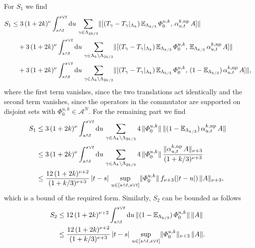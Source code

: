 \documentclass[a4paper]{article}
\newcommand{\E}{\mathbb{E}}
\renewcommand{\Phi}{\varPhi}
\newcommand{\mA}{\mathcal{A}}
\newcommand{\dd}{\mathrm{d}}
\DeclarePairedDelimiter\norm{\lVert}{\rVert}
\DeclarePairedDelimiter\abs{\lvert}{\rvert}
\theoremstyle{plain}
\theoremstyle{definition}
\theoremstyle{remark}
\renewcommand{\(}{\left(}
\renewcommand{\)}{\right)}
\begin{document}
    For $S_1$ we find
    \begin{align*}
        S_1
        &\leq 
        3\,(1+2k)^\nu \int_{s\land t}^{s\lor t} \dd u \, \sum_{\gamma \in \Lambda_{2k/3}} \norm{[(T_\gamma - T_\gamma|_{\Lambda_k})\, \E_{\Lambda_{k/3}} \, \Phi_0^{u,k}, \, \alpha_{u,t}^{k,\mathrm{np}} \, A] }
        \\
        &\hspace{1em}+
        3\,(1+2k)^\nu \int_{s\land t}^{s\lor t} \dd u \, \sum_{\gamma \in \Lambda_k \setminus \Lambda_{2k/3}} \norm{[(T_\gamma - T_\gamma|_{\Lambda_k})\, \E_{\Lambda_{k/3}} \, \Phi_0^{u,k}, \, \E_{\Lambda_{k/3}} \, \alpha_{u,t}^{k,\mathrm{np}} \, A] }
        \\
        &\hspace{1em}+
        3\,(1+2k)^\nu \int_{s\land t}^{s\lor t} \dd u \, \sum_{\gamma \in \Lambda_k \setminus \Lambda_{2k/3}} \norm{[(T_\gamma - T_\gamma|_{\Lambda_k})\, \E_{\Lambda_{k/3}} \, \Phi_0^{u,k}, \, (1-\E_{\Lambda_{k/3}}) \, \alpha_{u,t}^{k,\mathrm{np}} \, A] }
        ,
    \end{align*}
    where the first term vanishes, since the two translations act identically and the second term vanishes, since the operators in the commutator are supported on disjoint sets with $\Phi_0^{u,k}\in \mA^N$. For the remaining part we find
    \begin{align*}
        S_1
        &\leq
        3\,(1+2k)^\nu \int_{s\land t}^{s\lor t} \dd u \, \sum_{\gamma \in \Lambda_k \setminus \Lambda_{2k/3}} 4\,\norm{\Phi_0^{u,k} } \, \norm{ (1-\E_{\Lambda_{k/3}}) \, \alpha_{u,t}^{k,\mathrm{np}} \, A }
        \\
        &\leq
        3\,(1+2k)^\nu \int_{s\land t}^{s\lor t} \dd u \, \sum_{\gamma \in \Lambda_k \setminus \Lambda_{2k/3}} 4\,\norm{\Phi_0^{u,k} } \, \frac{\norm{\alpha_{u,t}^{k,\mathrm{np}} \, A}_{\nu+3}}{(1+k/3)^{\nu+3}}
        \\
        &\leq
         \frac{12\,(1+2k)^{\nu+2}}{(1+k/3)^{\nu+3}} \, \abs{t-s}\, \sup_{u\in [s \land t, s\lor t]} \norm{\Phi_0^{u,k} } \, f_{\nu+3}(\abs{t-u}) \,\norm{ A}_{\nu+3} , 
    \end{align*}
    which is a bound of the required form. Similarly, $S_2$ can be bounded as follows
    \begin{align*}
        S_2 
        &\leq
        12\,(1+2k)^{\nu+2} \int_{s\land t}^{s\lor t} \dd u \,   \norm{(1 - \E_{\Lambda_{k/3}}) \, \Phi_0^{u,k}} \, \norm{A }
        \\
        &\leq
        \frac{12\,(1+2k)^{\nu+2}}{(1+k/3)^{\nu + 3}} \, \abs{t-s}\,\sup_{u\in [s \land t, s\lor t]} \norm{\Phi_0^{u,k}}_{\nu+3} \, \norm{A}.
    \end{align*}
\end{document}
